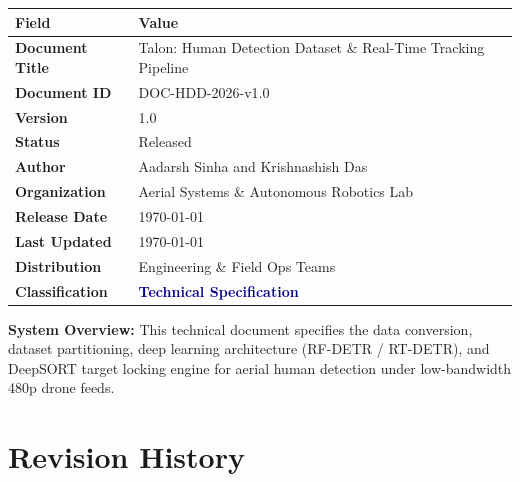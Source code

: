 \documentclass[11pt,a4paper]{article}
\begin{document}
\begin{table}[H]
    \renewcommand{\arraystretch}{1.5}
    \begin{tabularx}{\textwidth}{@{}lX@{}}
        \toprule
        \textbf{Field} & \textbf{Value} \\
        \midrule
        \textbf{Document Title} & Talon: Human Detection Dataset \& Real-Time Tracking Pipeline \\
        \textbf{Document ID}    & DOC-HDD-2026-v1.0 \\
        \textbf{Version}        & 1.0 \\
        \textbf{Status}         & Released \\
        \midrule
        \textbf{Author}         & Aadarsh Sinha and Krishnashish Das \\
        \textbf{Organization}   & Aerial Systems \& Autonomous Robotics Lab \\
        \midrule
        \textbf{Release Date}   & \today \\
        \textbf{Last Updated}   & \today \\
        \midrule
        \textbf{Distribution}   & Engineering \& Field Ops Teams \\
        \textbf{Classification} & \textcolor{darkblue}{\textbf{Technical Specification}} \\
        \bottomrule
    \end{tabularx}
\end{table}

\vspace{1cm}

\begin{notebox}
    \textbf{System Overview:} This technical document specifies the data conversion, dataset partitioning, deep learning architecture (RF-DETR / RT-DETR), and DeepSORT target locking engine for aerial human detection under low-bandwidth 480p drone feeds.
\end{notebox}

\newpage
\section*{Revision History}
\end{document}
